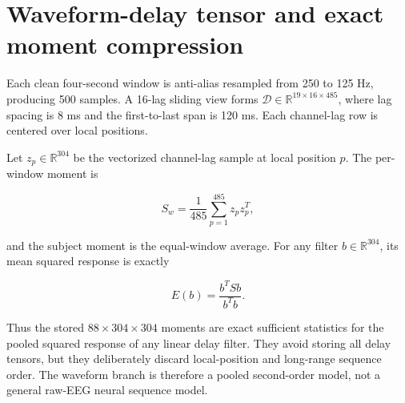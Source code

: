 \section{Waveform-delay tensor and exact moment compression}

Each clean four-second window is anti-alias resampled from 250 to 125 Hz,
producing 500 samples. A 16-lag sliding view forms
$\mathcal{D}\in\mathbb{R}^{19\times16\times485}$, where lag spacing is 8 ms and
the first-to-last span is 120 ms. Each channel-lag row is centered over local
positions.

Let $z_p\in\mathbb{R}^{304}$ be the vectorized channel-lag sample at local
position $p$. The per-window moment is

\begin{equation}
S_w=\frac{1}{485}\sum_{p=1}^{485} z_p z_p^T,
\end{equation}

and the subject moment is the equal-window average. For any filter
$b\in\mathbb{R}^{304}$, its mean squared response is exactly

\begin{equation}
E(b)=\frac{b^T S b}{b^T b}.
\label{eq:moment-energy}
\end{equation}

Thus the stored $88\times304\times304$ moments are exact sufficient statistics
for the pooled squared response of any linear delay filter. They avoid storing
all delay tensors, but they deliberately discard local-position and long-range
sequence order. The waveform branch is therefore a pooled second-order model,
not a general raw-EEG neural sequence model.



